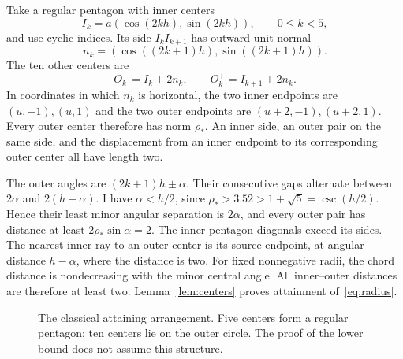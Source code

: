 \documentclass[11pt]{amsart}
\theoremstyle{definition}
\theoremstyle{remark}
\numberwithin{equation}{section}
\newcommand{\rhoopt}{\rho_*}
\begin{document}
Take a regular pentagon with inner centers
\[
 I_k=a(\cos(2kh),\sin(2kh)),\qquad 0\leq k<5,
\]
and use cyclic indices. Its side $I_kI_{k+1}$ has outward unit normal
\[
 n_k=(\cos((2k+1)h),\sin((2k+1)h)).
\]
The ten other centers are
\begin{equation}\label{eq:outer}
 O_k^-=I_k+2n_k,\qquad O_k^+=I_{k+1}+2n_k.
\end{equation}
In coordinates in which $n_k$ is horizontal, the two inner endpoints are
$(u,-1),(u,1)$ and the two outer endpoints are $(u+2,-1),(u+2,1)$.
Every outer center therefore has norm $\rhoopt$. An inner side, an outer
pair on the same side, and the displacement from an inner endpoint to its
corresponding outer center all have length two.

The outer angles are $(2k+1)h\pm\alpha$. Their consecutive gaps alternate
between $2\alpha$ and $2(h-\alpha)$. I have $\alpha<h/2$, since
$\rhoopt>3.52>1+\sqrt5=\csc(h/2)$. Hence their least minor angular
separation is $2\alpha$, and every outer pair has distance at least
$2\rhoopt\sin\alpha=2$. The inner pentagon diagonals exceed its sides.
The nearest inner ray to an outer center is its source endpoint, at angular
distance $h-\alpha$, where the distance is two. For fixed nonnegative
radii, the chord distance is nondecreasing with the minor central angle.
All inner--outer distances are therefore at least two. Lemma~\ref{lem:centers}
proves attainment of~\eqref{eq:radius}.

\begin{figure}[ht]
\centering
{}
\caption{The classical attaining arrangement. Five centers form a regular
pentagon; ten centers lie on the outer circle. The proof of the lower bound
does not assume this structure.}
\label{fig:packing}
\end{figure}
\end{document}
